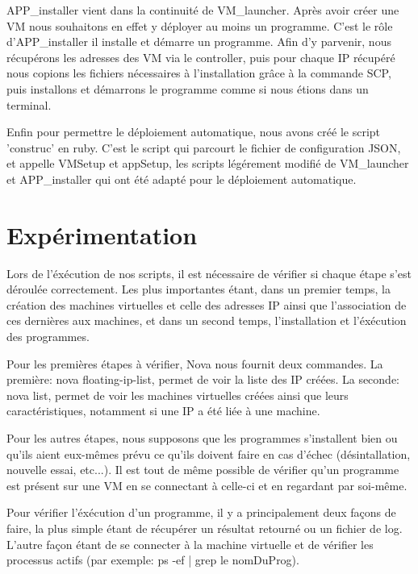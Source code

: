 \documentclass{report}
\begin{document}
APP\_installer vient dans la continuité de VM\_launcher. Après avoir créer une VM nous souhaitons en effet y déployer au moins un programme. C'est le rôle d'APP\_installer il installe et démarre un programme. Afin d'y parvenir, nous récupérons les adresses des VM via le controller, puis pour chaque IP récupéré nous copions les fichiers nécessaires à l'installation grâce à la commande SCP, puis installons et démarrons le programme comme si nous étions dans un terminal.\bigbreak

Enfin pour permettre le déploiement automatique, nous avons créé le script 'construc' en ruby. C'est le script qui parcourt le fichier de configuration JSON, et appelle VMSetup et appSetup, les scripts légérement modifié de VM\_launcher et APP\_installer qui ont été adapté pour le déploiement automatique.\bigbreak

    \section{Expérimentation}

Lors de l'éxécution de nos scripts, il est nécessaire de vérifier si chaque étape s'est déroulée correctement. Les plus importantes étant, dans un premier temps, la création des machines virtuelles et celle des adresses IP ainsi que l'association de ces dernières aux machines, et dans un second temps, l'installation et l'éxécution des programmes.\bigbreak

Pour les premières étapes à vérifier, Nova nous fournit deux commandes. La première: nova floating-ip-list, permet de voir la liste des IP créées. La seconde: nova list, permet de voir les machines virtuelles créées ainsi que leurs caractéristiques, notamment si une IP a été liée à une machine.\bigbreak


Pour les autres étapes, nous supposons que les programmes s'installent bien ou qu'ils aient eux-mêmes prévu ce qu'ils doivent faire en cas d'échec (désintallation, nouvelle essai, etc...). Il est tout de même possible de vérifier qu'un programme est présent sur une VM en se connectant à celle-ci et en regardant par soi-même.\bigbreak

Pour vérifier l'éxécution d'un programme, il y a principalement  deux façons de faire, la plus simple étant de récupérer un résultat retourné ou un fichier de log. L'autre façon étant de se connecter à la machine virtuelle et de vérifier les processus actifs (par exemple: ps -ef | grep le nomDuProg).\bigbreak
\end{document}

